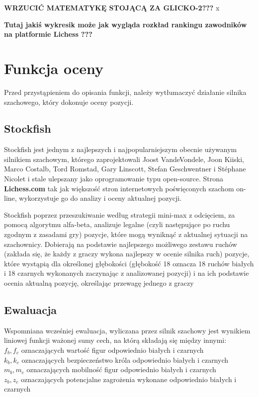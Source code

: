 \documentclass[inzynierska]{pwr_wmat_praca_dyplomowa}
\theoremstyle{plain}
\numberwithin{theorem}{chapter}
\theoremstyle{definition}
\numberwithin{theorem}{chapter}
\begin{document}
\textbf{WRZUCIĆ MATEMATYKĘ STOJĄCĄ ZA GLICKO-2???}
x

\textbf{Tutaj jakiś wykresik może jak wygląda rozkład rankingu zawodników na platformie Lichess ???}
\section{Funkcja oceny}
Przed przystąpieniem do opisania funkcji, należy wytłumaczyć działanie silnika szachowego, który dokonuje oceny pozycji.
\subsection{Stockfish}
Stockfish jest jednym z najlepszych i najpopularniejszym obecnie używanym silnikiem szachowym, którego zaprojektowali Joost VandeVondele, Joon Kiiski, Marco Costalb, Tord Romstad, Gary Linscott, Stefan Geschwentner i Stéphane Nicolet i stale ulepszany jako oprogramowanie typu open-source. Strona \textbf{Lichess.com}\cite{stockfish_lichess} tak jak większość stron internetowych poświęconych szachom on-line, wykorzystuje go do analizy i oceny aktualnej pozycji.

Stockfish poprzez przeszukiwanie według strategii mini-max z odcięciem, za pomocą algorytmu alfa-beta, analizuje legalne (czyli następujące po ruchu zgodnym z zasadami gry) pozycje, które mogą wyniknąć z aktualnej sytuacji na szachownicy. Dobierają na podstawie najlepszego możliwego zestawu ruchów (zakłada się, że każdy z graczy wykona najlepszy w ocenie silnika ruch) pozycje, które wystąpią dla określonej głębokości (głębokość 18 oznacza 18 ruchów białych i 18 czarnych wykonanych zaczynając z analizowanej pozycji) i na ich podstawie ocenia aktualną pozycję, określając przewagę jednego z graczy

\subsection{Ewaluacja}
Wspomniana wcześniej ewaluacja, wyliczana przez silnik szachowy jest wynikiem liniowej funkcji 
ważonej sumy cech, na którą składają się między innymi:\\
$f_b,f_c$ oznaczających wartość figur odpowiednio białych i czarnych\\
$k_b,k_c$ oznaczających bezpieczeństwo króla odpowiednio białych i czarnych\\
$m_b,m_c$ oznaczających mobilność figur odpowiednio białych i czarnych\\
$z_b,z_c$ oznaczających potencjalne zagrożenia wykonane odpowiednio białych i czarnych\\
\end{document}
